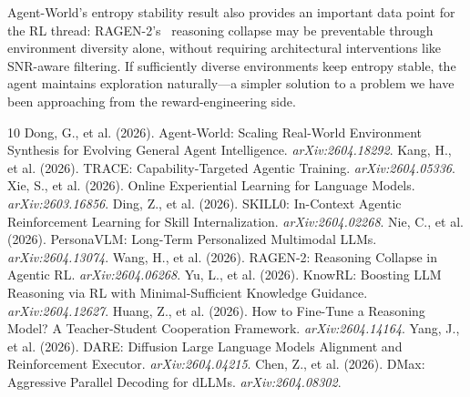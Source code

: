 \documentclass[11pt]{article}
\begin{document}
Agent-World's entropy stability result also provides an important data point for the RL thread: RAGEN-2's~\cite{ragen2} reasoning collapse may be preventable through environment diversity alone, without requiring architectural interventions like SNR-aware filtering. If sufficiently diverse environments keep entropy stable, the agent maintains exploration naturally---a simpler solution to a problem we have been approaching from the reward-engineering side.

\begin{thebibliography}{10}
 Dong, G., et al. (2026). Agent-World: Scaling Real-World Environment Synthesis for Evolving General Agent Intelligence. \textit{arXiv:2604.18292}.
 Kang, H., et al. (2026). TRACE: Capability-Targeted Agentic Training. \textit{arXiv:2604.05336}.
 Xie, S., et al. (2026). Online Experiential Learning for Language Models. \textit{arXiv:2603.16856}.
 Ding, Z., et al. (2026). SKILL0: In-Context Agentic Reinforcement Learning for Skill Internalization. \textit{arXiv:2604.02268}.
 Nie, C., et al. (2026). PersonaVLM: Long-Term Personalized Multimodal LLMs. \textit{arXiv:2604.13074}.
 Wang, H., et al. (2026). RAGEN-2: Reasoning Collapse in Agentic RL. \textit{arXiv:2604.06268}.
 Yu, L., et al. (2026). KnowRL: Boosting LLM Reasoning via RL with Minimal-Sufficient Knowledge Guidance. \textit{arXiv:2604.12627}.
 Huang, Z., et al. (2026). How to Fine-Tune a Reasoning Model? A Teacher-Student Cooperation Framework. \textit{arXiv:2604.14164}.
 Yang, J., et al. (2026). DARE: Diffusion Large Language Models Alignment and Reinforcement Executor. \textit{arXiv:2604.04215}.
 Chen, Z., et al. (2026). DMax: Aggressive Parallel Decoding for dLLMs. \textit{arXiv:2604.08302}.
\end{thebibliography}
\end{document}
